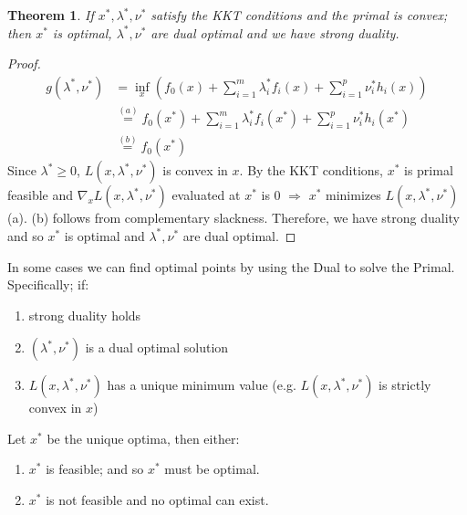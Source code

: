 \documentclass[]{article}
\theoremstyle{mattstyle}
\newtheorem{theorem}{Theorem}[section]
\theoremstyle{definition}
\begin{document}
\begin{theorem}
	If $x^*, \lambda^*, \nu^*$ satisfy the KKT conditions and the primal is convex; then $x^*$ is optimal, $\lambda^*, \nu^*$ are dual optimal and we have strong duality.
\end{theorem}
\begin{proof}
	\begin{align}
	g(\lambda^*, \nu^*) &= \inf_x \left( f_0(x) + \sum_{i=1}^m \lambda_i^*f_i(x) + \sum_{i=1}^p \nu_i^* h_i(x) \right) \\
	&\overset{(a)}{=}f_0(x^*) + \sum_{i=1}^m \lambda_i^*f_i(x^*) + \sum_{i=1}^p \nu_i^* h_i(x^*)\\
	&\overset{(b)}{=}f_0(x^*)
	\end{align}
	Since $\lambda^*\ge0$, $L(x,\lambda^*,\nu^*)$ is convex in $x$. By the KKT conditions, $x^*$ is primal feasible and $\nabla_x L(x,\lambda^*,\nu^*)$ evaluated at $x^*$ is 0 $\Rightarrow$ $x^*$ minimizes $L(x,\lambda^*,\nu^*)$ (a). (b) follows from complementary slackness. Therefore, we have strong duality and so $x^*$ is optimal and $\lambda^*, \nu^*$ are dual optimal.
\end{proof}




In some cases we can find optimal points by using the Dual to solve the Primal. Specifically; if:
\begin{enumerate}
	\item strong duality holds
	\item $(\lambda^*, \nu^*)$ is a dual optimal solution
	\item $L(x, \lambda^*, \nu^*)$ has a unique minimum value (e.g. $L(x, \lambda^*, \nu^*)$ is strictly convex in $x$)
\end{enumerate}
Let $x^*$ be the unique optima, then either:
\begin{enumerate}
	\item $x^*$ is feasible; and so $x^*$ must be optimal.
	\item $x^*$ is not feasible and no optimal can exist.
\end{enumerate}
\end{document}
